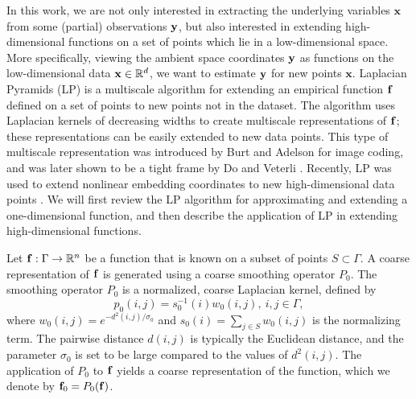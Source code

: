 In this work, we are not only interested in extracting the underlying variables $\mathbf{x}$ from some (partial) observations $\mathbf{y}$,
but also interested in extending high-dimensional functions on a set of points which lie in a low-dimensional space.
%
More specifically, viewing the ambient space coordinates $\mathbf{y}$ as functions on the low-dimensional data $\mathbf{x} \in \mathbb{R}^d$,
we want to estimate $\mathbf{y}$ for new points $\mathbf{x}$.
%
Laplacian Pyramids (LP) is a multiscale algorithm for extending an empirical function $\mathbf{f}$ defined on a set of points
to new points not in the dataset.
%
The algorithm uses Laplacian kernels of decreasing widths to create multiscale representations of $\mathbf{f}$;
these representations can be easily extended to new data points.
%
This type of multiscale representation was introduced by Burt and Adelson \cite{burt1983laplacian} for image coding,
and was later shown to be a tight frame by Do and Veterli \cite{do2003framing}.
%
Recently, LP was used to extend nonlinear embedding coordinates to new high-dimensional data points \cite{rabin2012heterogeneous}.
%
We will first review the LP algorithm for approximating and extending a one-dimensional function,
and then describe the application of LP in extending high-dimensional functions.

Let $\mathbf{f}: \Gamma \rightarrow \mathbb{R}^n$ be a function that is known on a subset of points $S \subset \Gamma$.
%
A coarse representation of $\mathbf{f}$ is generated using a coarse smoothing operator $P_0$.
%
The smoothing operator $P_0$ is a normalized, coarse Laplacian kernel, defined by
\begin{equation}
p_0(i, j)= s_0^{-1}(i)w_0(i, j),\: i, j \in \Gamma,
\end{equation}
where $w_0(i, j)=e^{-d^2(i, j) / \sigma_0}$ and $s_0(i)=\sum_{j \in S}w_0(i, j)$ is the normalizing term.
%
The pairwise distance $d(i, j)$ is typically the Euclidean distance, and the parameter $\sigma_0$ is set to be large compared to the values of $d^2(i, j)$.
%
The application of $P_0$ to $\mathbf{f}$ yields a coarse representation of the function, which we denote by $\mathbf{f}_0=P_0(\mathbf{f})$.

